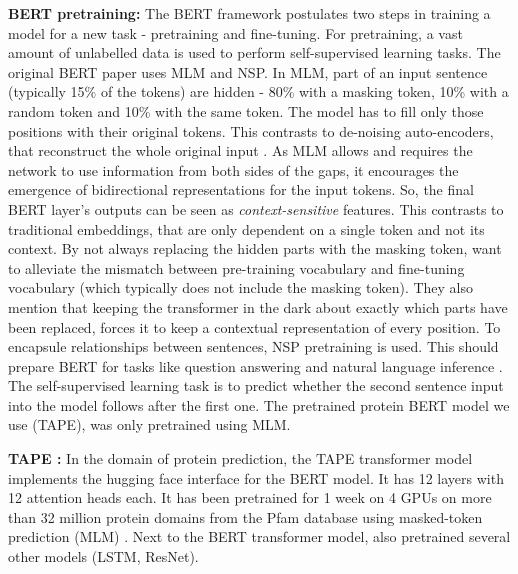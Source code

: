 \documentclass[msc,deptreport,ai]{infthesis} %
\begin{document}
		\textbf{BERT pretraining: } The \gls{BERT} framework \cite{devlin_bert_2019} postulates two steps in training a model for a new task - pretraining and fine-tuning. For pretraining, a vast amount of unlabelled data is used to perform self-supervised learning tasks. The original \gls{BERT} paper \cite{devlin_bert_2019} uses \gls{MLM} and \gls{NSP}. In \gls{MLM}, part of an input sentence (typically 15\% of the tokens) are hidden - 80\% with a masking token, 10\% with a random token and 10\% with the same token. The model has to fill only those positions with their original tokens. This contrasts to de-noising auto-encoders, that reconstruct the whole original input \cite{devlin_bert_2019}. As \gls{MLM} allows and requires the network to use information from both sides of the gaps, it encourages the emergence of bidirectional representations for the input tokens. So, the final \gls{BERT} layer's outputs can be seen as \textit{context-sensitive} features. This contrasts to traditional embeddings, that are only dependent on a single token and not its context. By not always replacing the hidden parts with the masking token, \cite{devlin_bert_2019} want to alleviate the mismatch between pre-training vocabulary and fine-tuning vocabulary (which typically does not include the masking token). They also mention that keeping the transformer in the dark about exactly which parts have been replaced, forces it to keep a contextual representation of every position. To encapsule relationships between sentences, \gls{NSP} pretraining is used. This should prepare \gls{BERT} for tasks like question answering and natural language inference \cite{devlin_bert_2019}. The self-supervised learning task is to predict whether the second sentence input into the model follows after the first one. The pretrained protein \gls{BERT} model we use (\acrshort{TAPE}), was only pretrained using \gls{MLM}.

		\textbf{TAPE \cite{rao_evaluating_2019}: } In the domain of protein prediction, the \gls{TAPE} transformer model \cite{rao_evaluating_2019} implements the hugging face interface for the \gls{BERT} model. It has 12 layers with 12 attention heads each. It has been pretrained for 1 week on 4 GPUs on more than 32 million protein domains \cite[supplement]{rao_evaluating_2019} from the Pfam database using masked-token prediction (\gls{MLM}) \cite{pfam_tape_2019}. Next to the \gls{BERT} transformer model, \cite{rao_evaluating_2019} also pretrained several other models (\acrshort{LSTM}, \acrshort{ResNet}). 
	
\end{document}
